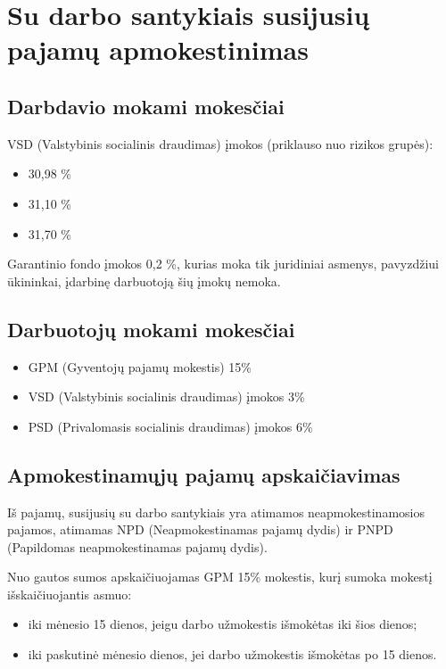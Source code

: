 \chapter{Su darbo santykiais susijusių pajamų apmokestinimas}

\section{Darbdavio mokami mokesčiai}

VSD (Valstybinis socialinis draudimas) įmokos (priklauso nuo rizikos
grupės):
\begin{itemize}
  \item 30,98 \%
  \item 31,10 \%
  \item 31,70 \%
\end{itemize}

Garantinio fondo įmokos 0,2 \%, kurias moka tik juridiniai asmenys,
pavyzdžiui ūkininkai, įdarbinę darbuotoją šių įmokų nemoka.


\section{Darbuotojų mokami mokesčiai}

\begin{itemize}
  \item GPM (Gyventojų pajamų mokestis) 15\%
  \item VSD (Valstybinis socialinis draudimas) įmokos 3\%
  \item PSD (Privalomasis socialinis draudimas) įmokos 6\%
\end{itemize}

\section{Apmokestinamųjų pajamų apskaičiavimas}

Iš pajamų, susijusių su darbo santykiais yra atimamos neapmokestinamosios
pajamos, atimamas NPD (Neapmokestinamas pajamų dydis) ir PNPD
(Papildomas neapmokestinamas pajamų dydis).

Nuo gautos sumos apskaičiuojamas GPM 15\% mokestis, kurį sumoka
mokestį išskaičiuojantis asmuo:
\begin{itemize}
  \item iki mėnesio 15 dienos, jeigu darbo užmokestis išmokėtas
    iki šios dienos;
  \item iki paskutinė mėnesio dienos, jei darbo užmokestis išmokėtas
    po 15 dienos.
\end{itemize}

